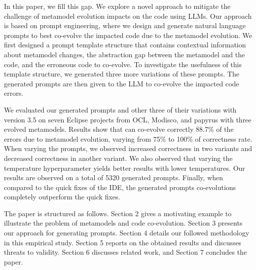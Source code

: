In this paper, we fill this gap. 
We explore a novel approach to mitigate the challenge of metamodel evolution impacts on the code using LLMs. 
Our approach is based on prompt engineering, where we design and generate natural language prompts to best co-evolve the impacted code due to the metamodel evolution. We first designed a prompt template structure that contains contextual information about metamodel changes, the abstraction gap between the metamodel and the code, and the erroneous code to co-evolve. To investigate the usefulness of this template structure, we generated three more variations of these prompts. The generated prompts are then given to the LLM to co-evolve the impacted code errors.

We evaluated our generated prompts and other three of their variations with \LLM version 3.5 on seven Eclipse  projects from OCL, Modisco, and papyrus with three evolved metamodels. 
Results show that \LLM can co-evolve correctly 88.7\% of the errors due to metamodel evolution, varying from 75\% to 100\% of correctness rate. 
When varying the prompts, we observed increased correctness in two variants and decreased correctness in another variant. We also observed that varying the temperature hyperparameter yields better results with lower temperatures. 
Our results are observed on a total of 5320 generated prompts. 
Finally, when compared to the quick fixes of the IDE, the generated prompts co-evolutions completely outperform the quick fixes. 


The paper is structured as follows.  Section 2 gives a motivating example to illustrate the problem of metamodels and code co-evolution. Section 3 presents our approach for generating prompts.  Section 4 details our followed methodology in this empirical study. Section 5 reports on the obtained results and discusses threats to validity. Section 6 discusses related work, and Section 7 concludes the paper. 
